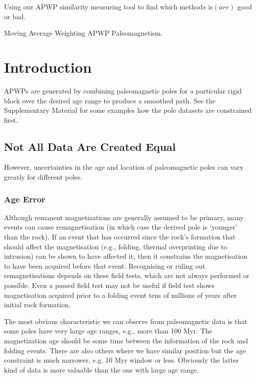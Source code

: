 \begin{summary}
Using our APWP similarity measuring tool to find which method\(s\) is$(are)$
good or bad.
\end{summary}

\begin{keywords}
  Moving Average \textendash{} Weighting \textendash{} APWP \textendash{}
  Paleomagnetism.
\end{keywords}

\section{Introduction}

APWPs are generated by combining paleomagnetic poles for a particular rigid
block over the desired age range to produce a smoothed path. See the
Supplementary Material for some examples how the pole datasets are constrained
first.

\subsection{Not All Data Are Created Equal}

However, uncertainties in the age and location of paleomagnetic poles can vary
greatly for different poles.

\subsubsection{Age Error}

Although remanent magnetizations are generally assumed to be primary, many
events can cause remagnetisation (in which case the derived pole is `younger'
than the rock). If an event that has occurred since the rock's formation that
should affect the magnetisation (e.g., folding, thermal overprinting due to
intrusion) can be shown to have affected it, then it constrains the
magnetisation to have been acquired before that event. Recognising or ruling
out remagnetisations depends on these field tests, which are not always
performed or possible. Even a passed field test may not be useful if field test
shows magnetisation acquired prior to a folding event tens of millions of years
after initial rock formation.

The most obvious characteristic we can observe from paleomagnetic data is that
some poles have very large age ranges, e.g., more than 100 Myr. The
magnetization age should be some time between the information of the rock and
folding events. There are also others where we have similar position but the
age constraint is much narrower, e.g. 10 Myr window or less. Obviously the
latter kind of data is more valuable than the one with large age range.

